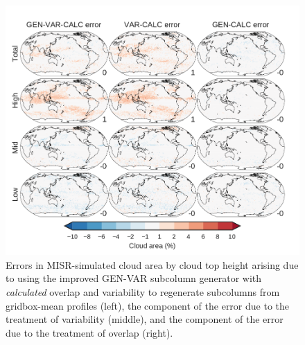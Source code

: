 \begin{figure}[htbp]
\centering
\includegraphics{graphics/subgrid2_cldmisr_maps_gen-var-calc_diff.pdf}
\caption{\label{fig:subgrid2_cldmisr_maps_gen-var-calc_diff}Errors in
MISR-simulated cloud area by cloud top height arising due to using the
improved GEN-VAR subcolumn generator with \emph{calculated} overlap and
variability to regenerate subcolumns from gridbox-mean profiles (left),
the component of the error due to the treatment of variability (middle),
and the component of the error due to the treatment of overlap
(right).}\label{fig:subgrid2ux5fcldmisrux5fmapsux5fgen-var-calcux5fdiff}
\end{figure}

